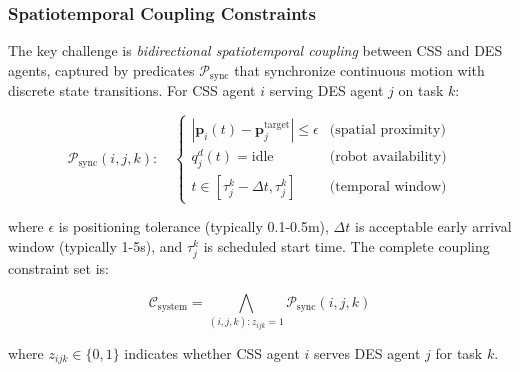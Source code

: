 \documentclass[manuscript,screen,review]{acmart}
\begin{document}
\subsubsection{Spatiotemporal Coupling Constraints}

The key challenge is \textit{bidirectional spatiotemporal coupling} between CSS and DES agents,
captured by predicates $\mathcal{P}_{\text{sync}}$ that synchronize continuous
motion with discrete state transitions. For CSS agent $i$ serving DES agent $j$
on task $k$:

\begin{equation}
\mathcal{P}_{\text{sync}}(i, j, k): \quad
\begin{cases}
|\mathbf{p}_i(t) - \mathbf{p}_j^{\text{target}}| \leq \epsilon & \text{(spatial proximity)} \\
q_j^d(t) = \text{idle} & \text{(robot availability)} \\
t \in [\tau_j^k - \Delta t, \tau_j^k] & \text{(temporal window)}
\end{cases}
\label{eq:coupling_predicate}
\end{equation}

where $\epsilon$ is positioning tolerance (typically 0.1-0.5m), $\Delta t$
is acceptable early arrival window (typically 1-5s), and $\tau_j^k$ is scheduled
start time. The complete coupling constraint set is:

\begin{equation}
\mathcal{C}_{\text{system}} = \bigwedge_{(i,j,k): z_{ijk}=1} \mathcal{P}_{\text{sync}}(i, j, k)
\label{eq:coupling_constraints}
\end{equation}

where $z_{ijk} \in \{0,1\}$ indicates whether CSS agent $i$ serves DES agent $j$
for task $k$.
\end{document}
